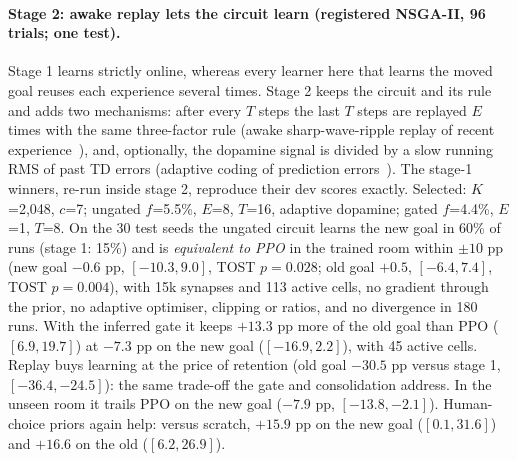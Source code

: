 \documentclass[10pt,onecolumn,letterpaper]{article}
\begin{document}
\paragraph{Stage 2: awake replay lets the circuit learn (registered NSGA-II, 96 trials; one test).} Stage 1 learns
strictly online, whereas every learner here that learns the moved goal reuses each experience several times. Stage 2 keeps
the circuit and its rule and adds two mechanisms: after every $T$ steps the last $T$ steps are replayed $E$ times with the
same three-factor rule (awake sharp-wave-ripple replay of recent experience~\cite{foster2006reverse,ambrose2016reverse}), and,
optionally, the dopamine signal is divided by a slow running RMS of past TD errors (adaptive coding of prediction
errors~\cite{tobler2005adaptive}). The stage-1 winners, re-run inside stage 2, reproduce their dev scores exactly. Selected:
$K$=2,048, $c$=7; ungated $f$=5.5\%, $E$=8, $T$=16, adaptive dopamine; gated $f$=4.4\%, $E$=1, $T$=8. On the 30 test seeds
the ungated circuit learns the new goal in 60\% of runs (stage 1: 15\%) and is \emph{equivalent to PPO} in the trained room
within $\pm10$ pp (new goal $-0.6$ pp, $[-10.3,9.0]$, TOST $p=0.028$; old goal $+0.5$, $[-6.4,7.4]$, TOST $p=0.004$),
with 15k synapses and 113 active cells, no gradient through the prior, no adaptive optimiser, clipping or ratios, and no
divergence in 180 runs. With the inferred gate it keeps $+13.3$ pp more of the old goal than PPO ($[6.9,19.7]$) at
$-7.3$ pp on the new goal ($[-16.9,2.2]$), with 45 active cells. Replay buys learning at the price of retention
(old goal $-30.5$ pp versus stage 1, $[-36.4,-24.5]$): the same trade-off the gate and consolidation address. In the unseen
room it trails PPO on the new goal ($-7.9$ pp, $[-13.8,-2.1]$). Human-choice priors again help: versus scratch, $+15.9$ pp
on the new goal ($[0.1,31.6]$) and $+16.6$ on the old ($[6.2,26.9]$).
\end{document}

